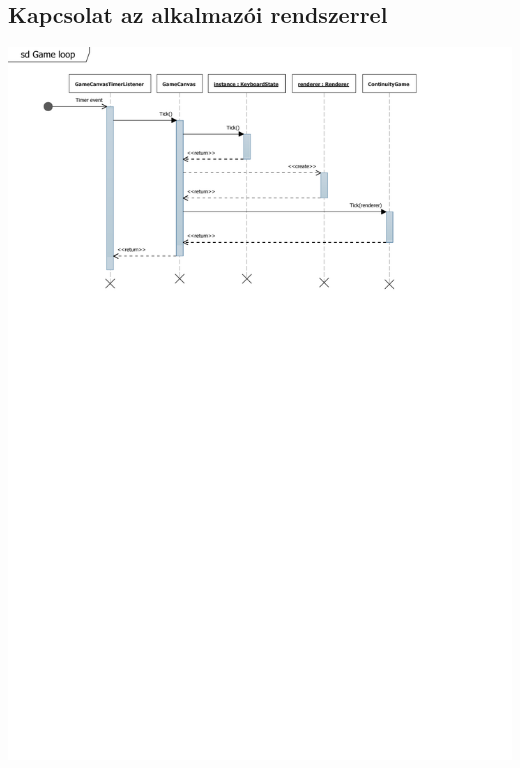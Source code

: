 
	
\subsection{Kapcsolat az alkalmazói rendszerrel}

\begin{center}
\includegraphics[scale=0.8]{11_SD1_GameLoop.pdf}
\newpage

\end{center}
